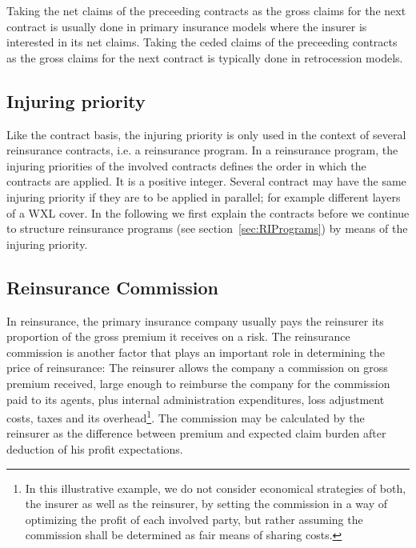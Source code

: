 Taking the net claims of the preceeding contracts as the gross claims for the next contract is usually done in primary insurance models where the insurer is interested in its net claims. Taking the ceded claims of the preceeding contracts as the gross claims for the next contract is typically done in retrocession models.

\subsection{Injuring priority}

Like the contract basis, the injuring priority  is only used in the context of several reinsurance contracts, i.e. a reinsurance program. In a reinsurance program, the injuring priorities of the involved contracts defines the order in which the contracts are applied. It is a positive integer. Several contract may have the same injuring priority if they are to be applied in parallel; for example different layers of a WXL cover. In the following we first explain the contracts before we continue to structure reinsurance programs (see section~\ref{sec:RIPrograms}) by means of the injuring priority. 


\subsection{Reinsurance Commission}
\label{subsec:commission}

In reinsurance, the primary insurance company usually pays the reinsurer its proportion of the gross premium it receives on a risk.
The reinsurance commission 
is another factor that plays an important role in determining the price of reinsurance:
The reinsurer allows the company a commission on gross premium received, large enough to
reimburse the company for the commission paid to its agents, plus internal administration
expenditures, loss adjustment costs, taxes and its overhead\footnote{In this illustrative example, we do not consider economical strategies of both, the insurer as well
as the reinsurer, by setting the commission in a way of optimizing the profit of each involved party, but rather assuming the
commission shall be determined as fair means of sharing costs.}.
The commission may be calculated by the reinsurer as the difference between premium and expected
claim burden after deduction of his profit expectations. 


